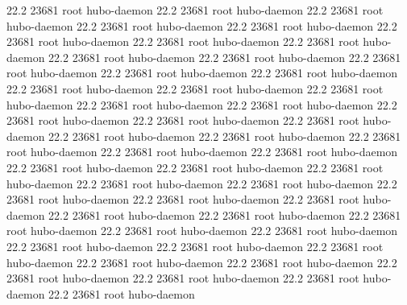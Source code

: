 22.2 23681 root     hubo-daemon
22.2 23681 root     hubo-daemon
22.2 23681 root     hubo-daemon
22.2 23681 root     hubo-daemon
22.2 23681 root     hubo-daemon
22.2 23681 root     hubo-daemon
22.2 23681 root     hubo-daemon
22.2 23681 root     hubo-daemon
22.2 23681 root     hubo-daemon
22.2 23681 root     hubo-daemon
22.2 23681 root     hubo-daemon
22.2 23681 root     hubo-daemon
22.2 23681 root     hubo-daemon
22.2 23681 root     hubo-daemon
22.2 23681 root     hubo-daemon
22.2 23681 root     hubo-daemon
22.2 23681 root     hubo-daemon
22.2 23681 root     hubo-daemon
22.2 23681 root     hubo-daemon
22.2 23681 root     hubo-daemon
22.2 23681 root     hubo-daemon
22.2 23681 root     hubo-daemon
22.2 23681 root     hubo-daemon
22.2 23681 root     hubo-daemon
22.2 23681 root     hubo-daemon
22.2 23681 root     hubo-daemon
22.2 23681 root     hubo-daemon
22.2 23681 root     hubo-daemon
22.2 23681 root     hubo-daemon
22.2 23681 root     hubo-daemon
22.2 23681 root     hubo-daemon
22.2 23681 root     hubo-daemon
22.2 23681 root     hubo-daemon
22.2 23681 root     hubo-daemon
22.2 23681 root     hubo-daemon
22.2 23681 root     hubo-daemon
22.2 23681 root     hubo-daemon
22.2 23681 root     hubo-daemon
22.2 23681 root     hubo-daemon
22.2 23681 root     hubo-daemon
22.2 23681 root     hubo-daemon
22.2 23681 root     hubo-daemon
22.2 23681 root     hubo-daemon
22.2 23681 root     hubo-daemon
22.2 23681 root     hubo-daemon
22.2 23681 root     hubo-daemon
22.2 23681 root     hubo-daemon
22.2 23681 root     hubo-daemon
